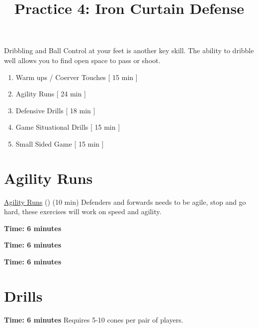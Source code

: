 \documentclass[10pt,letterpaper]{article}
\title{Practice 4: Iron Curtain Defense}
\author{}
\date{}
\newenvironment{agendablock}[1]{%
    \tcolorbox[beamer,%
    noparskip,breakable,
    colback=LightGray,colframe=DarkGray,%
    colbacklower=Gray!75!LightGray,%
    title=#1]}%
    {\endtcolorbox}
\begin{document}
\selectfont
\maketitle

\begin{agendablock}{Practice Activities}
    Dribbling and Ball Control at your feet is another key skill.  The ability to dribble well allows you to find open space to pass or shoot. 
    \begin{enumerate}
        \item Warm ups / Coerver Touches [ 15 min ]
        \item Agility Runs [ 24 min ]
        \item Defensive Drills [ 18 min ]
        \item Game Situational Drills [ 15 min ]
        \item Small Sided Game [ 15 min ]
    \end{enumerate}
\end{agendablock}



\clearpage



\section{Agility Runs}
\href{https://www.youtube.com/watch?v=3ew2m3m5f0M}{Agility Runs} () (10 min)
Defenders and forwards needs to be agile, stop and go hard, these exercises will work on speed and agility.

\textbf{Time: 6 minutes}


\textbf{Time: 6 minutes}


\textbf{Time: 6 minutes}


\clearpage

\section{Drills}

\textbf{Time: 6 minutes}  Requires 5-10 cones per pair of players.

\end{document}
